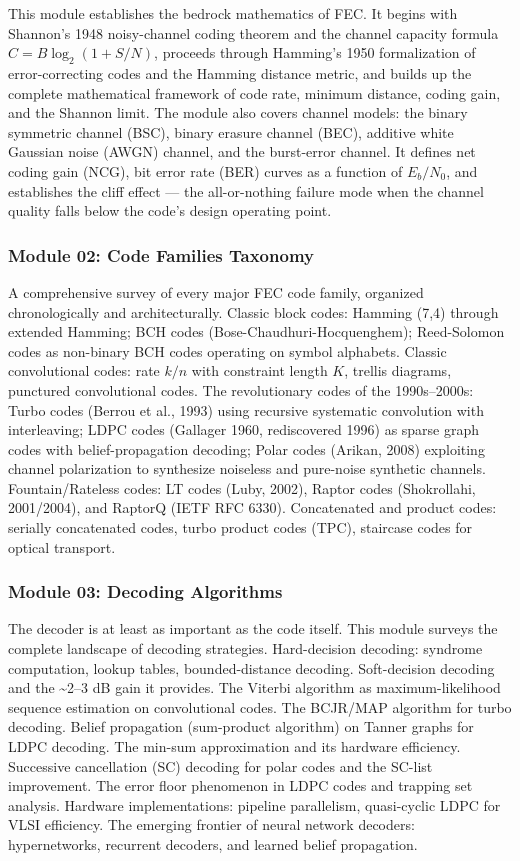 \documentclass[11pt,letterpaper]{article}
\begin{document}
This module establishes the bedrock mathematics of FEC. It begins with Shannon's 1948 noisy-channel coding theorem and the channel capacity formula $C = B \log_2(1 + S/N)$, proceeds through Hamming's 1950 formalization of error-correcting codes and the Hamming distance metric, and builds up the complete mathematical framework of code rate, minimum distance, coding gain, and the Shannon limit. The module also covers channel models: the binary symmetric channel (BSC), binary erasure channel (BEC), additive white Gaussian noise (AWGN) channel, and the burst-error channel. It defines net coding gain (NCG), bit error rate (BER) curves as a function of $E_b/N_0$, and establishes the cliff effect --- the all-or-nothing failure mode when the channel quality falls below the code's design operating point.

\subsubsection{Module 02: Code Families Taxonomy}

A comprehensive survey of every major FEC code family, organized chronologically and architecturally. Classic block codes: Hamming (7,4) through extended Hamming; BCH codes (Bose-Chaudhuri-Hocquenghem); Reed-Solomon codes as non-binary BCH codes operating on symbol alphabets. Classic convolutional codes: rate $k/n$ with constraint length $K$, trellis diagrams, punctured convolutional codes. The revolutionary codes of the 1990s--2000s: Turbo codes (Berrou et al., 1993) using recursive systematic convolution with interleaving; LDPC codes (Gallager 1960, rediscovered 1996) as sparse graph codes with belief-propagation decoding; Polar codes (Arikan, 2008) exploiting channel polarization to synthesize noiseless and pure-noise synthetic channels. Fountain/Rateless codes: LT codes (Luby, 2002), Raptor codes (Shokrollahi, 2001/2004), and RaptorQ (IETF RFC 6330). Concatenated and product codes: serially concatenated codes, turbo product codes (TPC), staircase codes for optical transport.

\subsubsection{Module 03: Decoding Algorithms}

The decoder is at least as important as the code itself. This module surveys the complete landscape of decoding strategies. Hard-decision decoding: syndrome computation, lookup tables, bounded-distance decoding. Soft-decision decoding and the \textasciitilde{}2--3 dB gain it provides. The Viterbi algorithm as maximum-likelihood sequence estimation on convolutional codes. The BCJR/MAP algorithm for turbo decoding. Belief propagation (sum-product algorithm) on Tanner graphs for LDPC decoding. The min-sum approximation and its hardware efficiency. Successive cancellation (SC) decoding for polar codes and the SC-list improvement. The error floor phenomenon in LDPC codes and trapping set analysis. Hardware implementations: pipeline parallelism, quasi-cyclic LDPC for VLSI efficiency. The emerging frontier of neural network decoders: hypernetworks, recurrent decoders, and learned belief propagation.
\end{document}
